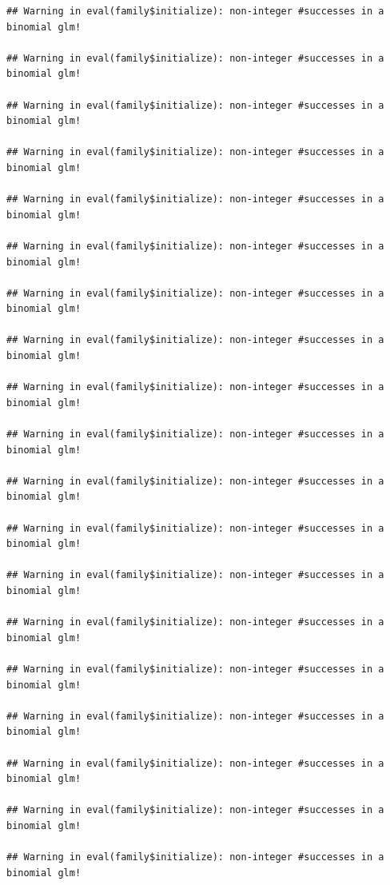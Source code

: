 \documentclass[
]{article}
\begin{document}
\begin{verbatim}
## Warning in eval(family$initialize): non-integer #successes in a binomial glm!

## Warning in eval(family$initialize): non-integer #successes in a binomial glm!

## Warning in eval(family$initialize): non-integer #successes in a binomial glm!

## Warning in eval(family$initialize): non-integer #successes in a binomial glm!

## Warning in eval(family$initialize): non-integer #successes in a binomial glm!

## Warning in eval(family$initialize): non-integer #successes in a binomial glm!

## Warning in eval(family$initialize): non-integer #successes in a binomial glm!

## Warning in eval(family$initialize): non-integer #successes in a binomial glm!

## Warning in eval(family$initialize): non-integer #successes in a binomial glm!

## Warning in eval(family$initialize): non-integer #successes in a binomial glm!

## Warning in eval(family$initialize): non-integer #successes in a binomial glm!

## Warning in eval(family$initialize): non-integer #successes in a binomial glm!

## Warning in eval(family$initialize): non-integer #successes in a binomial glm!

## Warning in eval(family$initialize): non-integer #successes in a binomial glm!

## Warning in eval(family$initialize): non-integer #successes in a binomial glm!

## Warning in eval(family$initialize): non-integer #successes in a binomial glm!

## Warning in eval(family$initialize): non-integer #successes in a binomial glm!

## Warning in eval(family$initialize): non-integer #successes in a binomial glm!

## Warning in eval(family$initialize): non-integer #successes in a binomial glm!
\end{verbatim}
\end{document}
